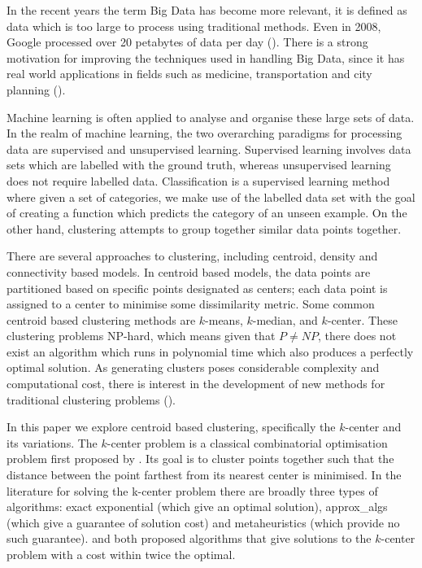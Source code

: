 In the recent years the term Big Data has become more relevant, it is defined as data which is too large to process using traditional methods. Even in 2008, Google processed over 20 petabytes of data per day (\cite{dean_mapreduce_2008}). There is a strong motivation for improving the techniques used in handling Big Data, since it has real world applications in fields such as medicine, transportation and city planning (\cite{al_nuaimi_applications_2015,obermeyer_predicting_2016}). 

Machine learning is often applied to analyse and organise these large sets of data. In the realm of machine learning, the two overarching paradigms for processing data are supervised and unsupervised learning. Supervised learning involves data sets which are labelled with the ground truth, whereas unsupervised learning does not require labelled data. Classification is a supervised learning method where given a set of categories, we make use of the labelled data set with the goal of creating a function which predicts the category of an unseen example. On the other hand, clustering attempts to group together similar data points together. 

There are several approaches to clustering, including centroid, density and connectivity based models. In centroid based models, the data points are partitioned based on specific points designated as centers; each data point is assigned to a center to minimise some dissimilarity metric. Some common centroid based clustering methods are $k$-means, $k$-median, and $k$-center. These clustering problems NP-hard, which means given that $P\neq NP$, there does not exist an algorithm which runs in polynomial time which also produces a perfectly optimal solution. As generating clusters poses considerable complexity and computational cost, there is interest in the development of new methods for traditional clustering problems (\cite{zhao_parallel_1970}). 

In this paper we explore centroid based clustering, specifically the $k$-center and its variations. The $k$-center problem is a classical combinatorial optimisation problem first proposed by \textcite{hakimi_optimum_1964}. Its goal is to cluster points together such that the distance between the point farthest from its nearest center is minimised. In the literature for solving the k-center problem there are broadly three types of algorithms: exact exponential (which give an optimal solution), \gls{approx_algs} (which give a guarantee of solution cost) and \glspl{metaheuristic} (which provide no such guarantee). \textcite{gonzalez_clustering_1985} and \textcite{hochbaum_best_1985} both proposed algorithms that give solutions to the $k$-center problem with a cost within twice the optimal.

